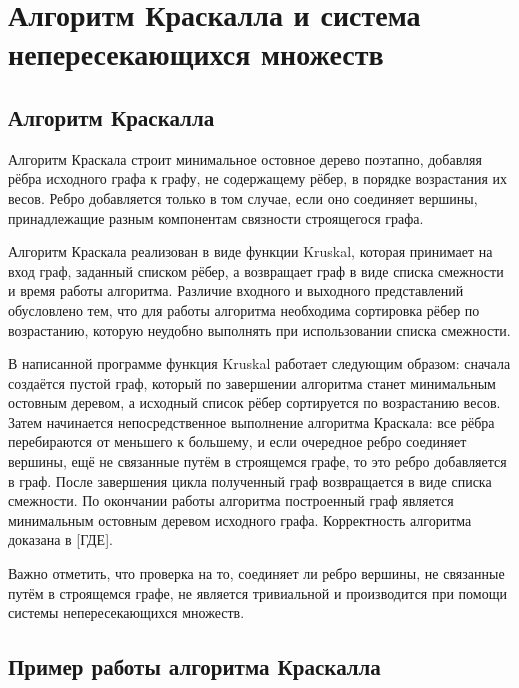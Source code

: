 	\section{Алгоритм Краскалла и система непересекающихся множеств}
	
	\subsection{Алгоритм Краскалла}
	
	\hspace{0.5 cm}
	
	Алгоритм Краскала строит минимальное остовное дерево поэтапно, добавляя рёбра исходного графа к графу, не содержащему рёбер, в порядке возрастания их весов. Ребро добавляется только в том случае, если оно соединяет вершины, принадлежащие разным компонентам связности строящегося графа.
	
	Алгоритм Краскала реализован в виде функции Kruskal, которая принимает на вход граф, заданный списком рёбер, а возвращает граф в виде списка смежности и время работы алгоритма. Различие входного и выходного представлений обусловлено тем, что для работы алгоритма необходима сортировка рёбер по возрастанию, которую неудобно выполнять при использовании списка смежности.
	
	В написанной программе функция Kruskal работает следующим образом: сначала создаётся пустой граф, который по завершении алгоритма станет минимальным остовным деревом, а исходный список рёбер сортируется по возрастанию весов. Затем начинается непосредственное выполнение алгоритма Краскала: все рёбра перебираются от меньшего к большему, и если очередное ребро соединяет вершины, ещё не связанные путём в строящемся графе, то это ребро добавляется в граф. После завершения цикла полученный граф возвращается в виде списка смежности. По окончании работы алгоритма построенный граф является минимальным остовным деревом исходного графа. Корректность алгоритма доказана в [ГДЕ].
	
	Важно отметить, что проверка на то, соединяет ли ребро вершины, не связанные путём в строящемся графе, не является тривиальной и производится при помощи системы непересекающихся множеств.
	
	\subsection{Пример работы алгоритма Краскалла}
	
